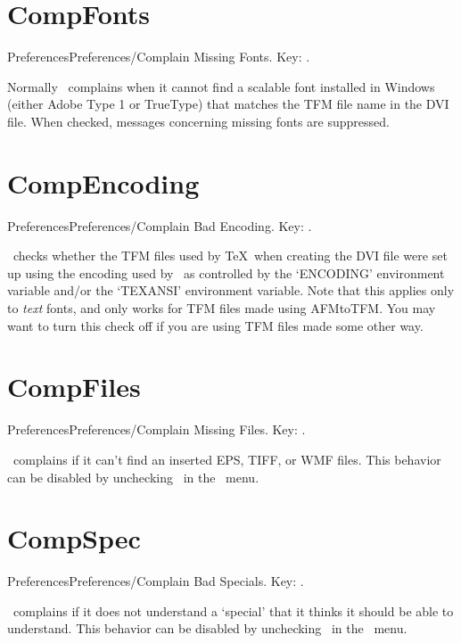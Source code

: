 \newpage

\section{CompFonts}{Preferences}Preferences/Complain Missing Fonts. Key: \none.

Normally \ complains when it cannot find a scalable font
installed in Windows (either Adobe Type 1 or TrueType) that matches
the TFM file name in the DVI file.
When checked, messages concerning missing fonts are suppressed.
   \bigskip

\section{CompEncoding}{Preferences}Preferences/Complain Bad Encoding. Key: \none.

\ checks whether the TFM files used by \TeX\ when creating
the DVI file were set up using the encoding
used by \ as controlled by the `ENCODING' environment
variable and/or the `TEXANSI' environment variable.  
Note that this applies only to {\it text\/} fonts, and only works for
TFM files made using AFMtoTFM.  You may want to turn this check off if
you are using TFM files made some other way. 
    \bigskip

\section{CompFiles}{Preferences}Preferences/Complain Missing Files. Key: \none.

\ complains if it can't find an inserted EPS, TIFF, or WMF
files. This behavior can be disabled by unchecking \ in the \ menu.
   \bigskip

\section{CompSpec}{Preferences}Preferences/Complain Bad Specials. Key: \none.

\ complains if it does not understand a `special' that it thinks
it should be able to understand.  This behavior can be disabled by
unchecking \ in the \ menu.
   \bigskip
   
\newpage   

